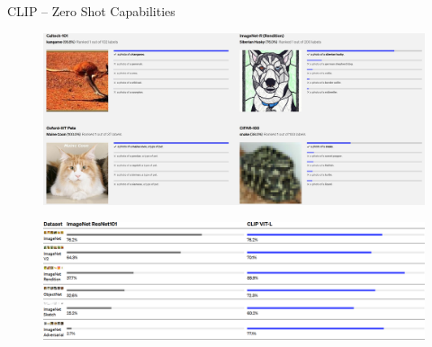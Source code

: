 \begin{frame}[allowframebreaks]{CLIP – Zero Shot Capabilities}
\framebreak
    \begin{figure}
        \centering
        \includegraphics[width=1\textwidth,height=0.9\textheight,keepaspectratio]{images/video/slide_56_1_img.jpg}
    \end{figure}
\framebreak
    \begin{figure}
        \centering
        \includegraphics[width=1\textwidth,height=0.9\textheight,keepaspectratio]{images/video/slide_57_1_img.png}
    \end{figure}
\end{frame}


